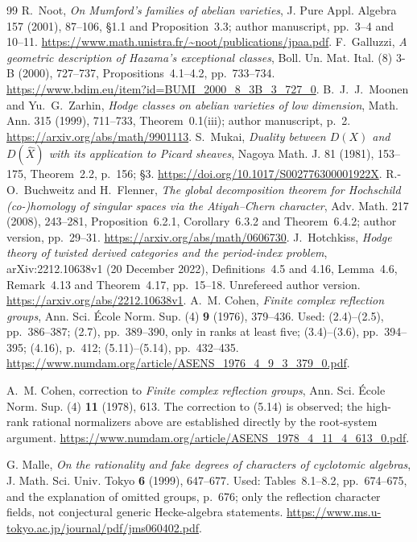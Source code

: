 \begin{thebibliography}{99}
 R.~Noot, \emph{On Mumford's families of abelian varieties}, J. Pure Appl. Algebra 157 (2001), 87--106, \S1.1 and Proposition~3.3; author manuscript, pp.~3--4 and 10--11. \url{https://www.math.unistra.fr/~noot/publications/jpaa.pdf}.
 F.~Galluzzi, \emph{A geometric description of Hazama's exceptional classes}, Boll. Un. Mat. Ital. (8) 3-B (2000), 727--737, Propositions~4.1--4.2, pp.~733--734. \url{https://www.bdim.eu/item?id=BUMI_2000_8_3B_3_727_0}.
 B.~J.~J.~Moonen and Yu.~G.~Zarhin, \emph{Hodge classes on abelian varieties of low dimension}, Math. Ann. 315 (1999), 711--733, Theorem~0.1(iii); author manuscript, p.~2. \url{https://arxiv.org/abs/math/9901113}.
 S.~Mukai, \emph{Duality between $D(X)$ and $D(\widehat X)$ with its application to Picard sheaves}, Nagoya Math. J. 81 (1981), 153--175, Theorem~2.2, p.~156; \S3. \url{https://doi.org/10.1017/S002776300001922X}.
 R.-O.~Buchweitz and H.~Flenner, \emph{The global decomposition theorem for Hochschild (co-)homology of singular spaces via the Atiyah--Chern character}, Adv. Math. 217 (2008), 243--281, Proposition~6.2.1, Corollary~6.3.2 and Theorem~6.4.2; author version, pp.~29--31. \url{https://arxiv.org/abs/math/0606730}.
 J.~Hotchkiss, \emph{Hodge theory of twisted derived categories and the period-index problem}, arXiv:2212.10638v1 (20 December 2022), Definitions~4.5 and 4.16, Lemma~4.6, Remark~4.13 and Theorem~4.17, pp.~15--18. Unrefereed author version. \url{https://arxiv.org/abs/2212.10638v1}.
A.~M. Cohen, \emph{Finite complex reflection groups},
Ann. Sci. \'Ecole Norm. Sup. (4) \textbf{9} (1976), 379--436.
Used: (2.4)--(2.5), pp.~386--387; (2.7), pp.~389--390,
only in ranks at least five; (3.4)--(3.6), pp.~394--395;
(4.16), p.~412; (5.11)--(5.14), pp.~432--435.
\url{https://www.numdam.org/article/ASENS_1976_4_9_3_379_0.pdf}.

A.~M. Cohen, correction to \emph{Finite complex reflection groups},
Ann. Sci. \'Ecole Norm. Sup. (4) \textbf{11} (1978), 613.
The correction to (5.14) is observed; the high-rank rational normalizers
above are established directly by the root-system argument.
\url{https://www.numdam.org/article/ASENS_1978_4_11_4_613_0.pdf}.

G. Malle, \emph{On the rationality and fake degrees of characters of
cyclotomic algebras}, J. Math. Sci. Univ. Tokyo \textbf{6} (1999),
647--677. Used: Tables~8.1--8.2, pp.~674--675, and the explanation of
omitted groups, p.~676; only the reflection character fields, not
conjectural generic Hecke-algebra statements.
\url{https://www.ms.u-tokyo.ac.jp/journal/pdf/jms060402.pdf}.


\end{thebibliography}
